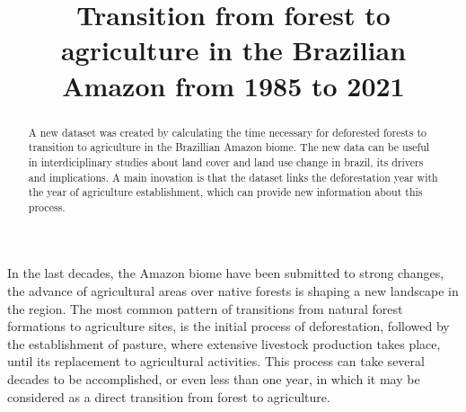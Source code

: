 \documentclass[essd, manuscript]{copernicus}
\begin{document}
\title{Transition from forest to agriculture in the Brazilian Amazon from 1985 to 2021}











\received{}
\pubdiscuss{} %
\revised{}
\accepted{}
\published{}




\maketitle


\begin{abstract}
A new dataset was created by calculating the time necessary for deforested forests to transition to agriculture in the Brazillian Amazon biome. The new data can be useful in interdiciplinary studies about land cover and land use change in brazil, its drivers and implications. A main inovation is that the dataset links the deforestation year with the year of agriculture establishment, which can provide new information about this process.
\end{abstract}




\introduction[Introduction]

In the last decades, the Amazon biome have been submitted to strong changes, the advance of agricultural areas over native forests is shaping a new landscape in the region.
The most common pattern of transitions from natural forest formations to agriculture sites, is the initial process of deforestation, followed by the establishment of pasture, where extensive livestock production takes place, until its replacement to agricultural activities.
This process can take several decades to be accomplished, or even less than one year, in which it may be considered as a direct transition from forest to agriculture.
\end{document}
